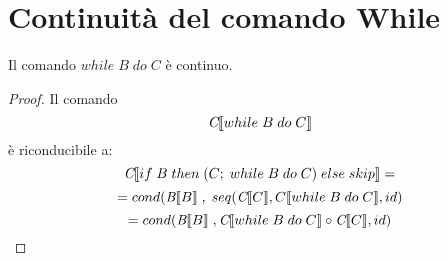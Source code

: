 \documentclass[a4paper, 10pt]{article} %
\begin{document}
\section{Continuità del comando While}
Il comando $ while\; B\; do\; C $ è continuo.

\begin{proof}

  Il comando $$\emph{C}\llbracket while\; B\; do\; C \rrbracket $$ è riconducibile a:
  $$ \emph{C}\llbracket if\; B\; then\; (C;\; while\; B\; do\; C)\; else\; skip \rrbracket = $$
  $$ = cond( \emph{B}\llbracket B \rrbracket\; ,\; seq(\emph{C}\llbracket C \rrbracket , C \llbracket \\ while\; B\; do\; C \rrbracket , id ) $$
  $$ = cond( \emph{B}\llbracket B \rrbracket\;, \emph{C}\llbracket while\; B\; do\; C \rrbracket \circ \emph{C}\llbracket C \rrbracket , id) $$


\end{proof}
\end{document}
